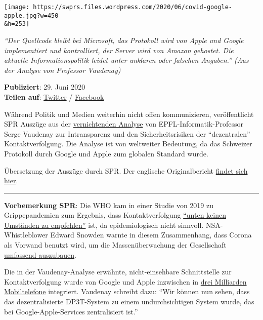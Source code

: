 \texttt{[image: https://swprs.files.wordpress.com/2020/06/covid-google-apple.jpg?w=450\\\&h=253]}

\emph{``Der Quellcode bleibt bei Microsoft, das Protokoll wird von Apple
und Google implementiert und kontrolliert, der Server wird von Amazon
gehostet. Die aktuelle Informationspolitik leidet unter unklaren oder
falschen Angaben.'' (Aus der Analyse von Professor Vaudenay)}

\textbf{Publiziert}: 29. Juni 2020\\
\textbf{Teilen auf}:
\href{https://twitter.com/intent/tweet?url=https://swprs.org/corona-app-ein-eklatanter-betrug/}{Twitter}
/
\href{https://www.facebook.com/share.php?u=https://swprs.org/corona-app-ein-eklatanter-betrug/}{Facebook}

Während Politik und Medien weiterhin nicht offen kommunizieren,
veröffentlicht SPR Auszüge aus der
\href{https://lasec.epfl.ch/people/vaudenay/swisscovid.html}{vernichtenden
Analyse} von EPFL-Informatik-Professor Serge Vaudenay zur Intransparenz
und den Sicherheitsrisiken der ``dezentralen'' Kontaktverfolgung. Die
Analyse ist von weltweiter Bedeutung, da das Schweizer Protokoll durch
Google und Apple zum globalen Standard wurde.

Übersetzung der Auszüge durch SPR. Der englische Originalbericht
\href{https://lasec.epfl.ch/people/vaudenay/swisscovid.html}{findet sich
hier}.

\begin{center}\rule{0.5\linewidth}{\linethickness}\end{center}

\textbf{Vorbemerkung SPR}: Die WHO kam in einer Studie von 2019 zu
Grippepandemien zum Ergebnis, dass Kontaktverfolgung
\href{https://apps.who.int/iris/bitstream/handle/10665/329438/9789241516839-eng.pdf\#page=9}{``unten
keinen Umständen zu empfehlen''} ist, da epidemiologisch nicht sinnvoll.
NSA-Whistleblower Edward Snowden warnte in diesem Zusammenhang, dass
Corona als Vorwand benutzt wird, um die Massenüberwachung der
Gesellschaft
\href{https://www.youtube.com/watch?v=-pcQFTzck_c}{umfassend
auszubauen}.

Die in der Vaudenay-Analyse erwähnte, nicht-einsehbare Schnittstelle zur
Kontaktverfolgung wurde von Google und Apple inzwischen in
\href{https://www.bloomberg.com/news/articles/2020-04-10/apple-google-bring-covid-19-contact-tracing-to-3-billion-people}{drei
Milliarden Mobiltelefone} integriert. Vaudenay schreibt dazu: ``Wir
können nun sehen, dass das dezentralisierte DP3T-System zu einem
undurchsichtigen System wurde, das bei Google-Apple-Services
zentralisiert ist.''

